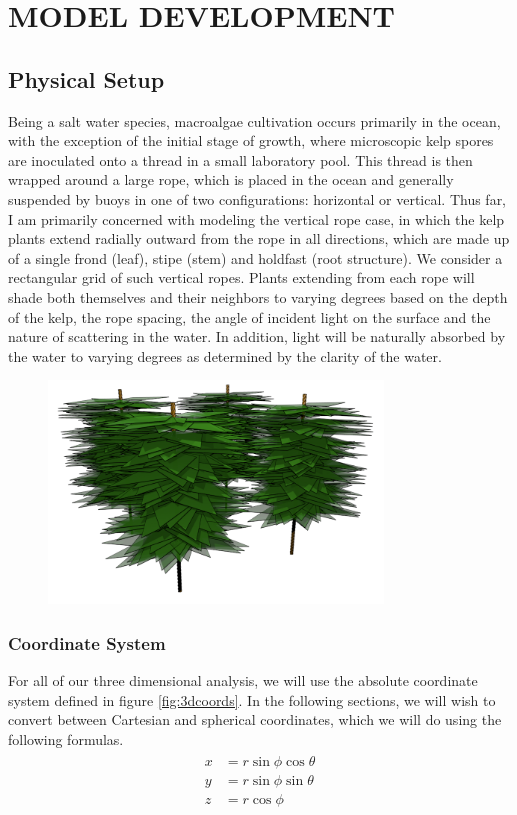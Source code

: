 \chapter{MODEL DEVELOPMENT} \label{label:modeldevelopment}

\graphicspath{{./figures/}}

\section{Physical Setup}
Being a salt water species, macroalgae cultivation occurs primarily in the ocean, with the exception of the initial stage of growth, where microscopic kelp spores are inoculated onto a thread in a small laboratory pool.
This thread is then wrapped around a large rope, which is placed in the ocean and generally suspended by buoys in one of two configurations: horizontal or vertical.
Thus far, I am primarily concerned with modeling the vertical rope case, in which the kelp plants extend radially outward from the rope in all directions, which are made up of a single frond (leaf), stipe (stem) and holdfast (root structure).
We consider a rectangular grid of such vertical ropes. 
Plants extending from each rope will shade both themselves and their neighbors
to varying degrees based on the depth of the kelp, the rope spacing, the angle
of incident light on the surface and the nature of scattering in the water.
In addition, light will be naturally absorbed by the water to varying degrees as determined by the clarity of the water.

\begin{figure}[H]
	\centering
	\includegraphics[width=3.5in]{kelp_array}
\end{figure}
\subsection{Coordinate System}
For all of our three dimensional analysis, we will use the absolute coordinate system defined in figure \ref{fig:3dcoords}.
In the following sections, we will wish to convert between Cartesian and spherical coordinates, which we will do using the following formulas.
\begin{align}
	\begin{split}
		x & = r\sin\phi\cos\theta \\
		y & = r\sin\phi\sin\theta \\
		z & = r\cos\phi \\
	\label{eqn:coords}
	\end{split}
\end{align}

